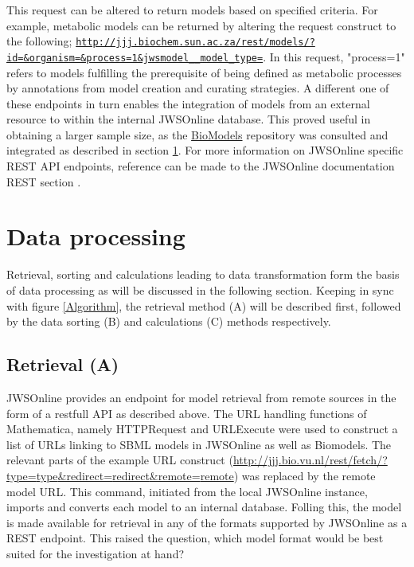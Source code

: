 This request can be altered to return models based on specified criteria. For example, metabolic models can be returned by altering the request construct to the following; \href{http://jjj.biochem.sun.ac.za/rest/models/?id=&organism=&process=1&jwsmodel__model_type=}{\nolinkurl{http://jjj.biochem.sun.ac.za/rest/models/?id=\&organism=\&process=1\&jwsmodel\_\_model\_type=}}. In this request, "process=1" refers to models fulfilling the prerequisite of being defined as metabolic processes by annotations from model creation and curating strategies. A different one of these endpoints in turn enables the integration of models from an external resource to within the internal JWSOnline database. This proved useful in obtaining a larger sample size, as the \href{https://www.ebi.ac.uk/biomodels-main/}{BioModels} repository was consulted and integrated as described in section \ref{Data processing}. For more information on JWSOnline specific REST API endpoints, reference can be made to the JWSOnline documentation REST section \cite{jwsdocs}. 

\section{Data processing} \label{Data processing}
Retrieval, sorting and calculations leading to data transformation form the basis of data processing as will be discussed in the following section. Keeping in sync with figure \ref{Algorithm}, the retrieval method (A) will be described first, followed by the data sorting (B) and calculations (C) methods respectively. 

\subsection{Retrieval (A)} \label{Retrieval}
JWSOnline provides an endpoint for model retrieval from remote sources in the form of a restfull API as described above. The URL handling functions of Mathematica, namely HTTPRequest and URLExecute were used to construct a list of URLs linking to SBML models in JWSOnline as well as Biomodels. The relevant parts of the example URL construct (\href{http://jjj.bio.vu.nl/rest/fetch/?type={type}&redirect={redirect}&remote={remote}}{http://jjj.bio.vu.nl/rest/fetch/?type={type}&redirect={redirect}&remote={remote}}) was replaced by the remote model URL. This command, initiated from the local JWSOnline instance, imports and converts each model to an internal database. Folling this, the model is made available for retrieval in any of the formats supported by JWSOnline as a REST endpoint. This raised the question, which model format would be best suited for the investigation at hand?

